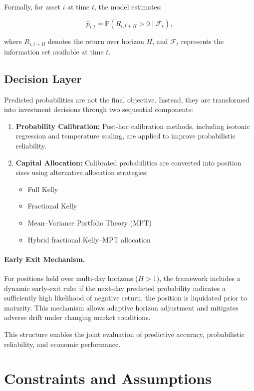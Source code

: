\documentclass{l4proj}
\begin{document}
Formally, for asset $i$ at time $t$, the model estimates:

\[
\hat{p}_{i,t} = \mathbb{P}(R_{i,t+H} > 0 \mid \mathcal{F}_t),
\]

where $R_{i,t+H}$ denotes the return over horizon $H$, and $\mathcal{F}_t$ represents the information set available at time $t$.

\subsection{Decision Layer}

Predicted probabilities are not the final objective. Instead, they are transformed into investment decisions through two sequential components:

\begin{enumerate}
    \item \textbf{Probability Calibration:}  
    Post-hoc calibration methods, including isotonic regression and temperature scaling, are applied to improve probabilistic reliability.

    \item \textbf{Capital Allocation:}  
    Calibrated probabilities are converted into position sizes using alternative allocation strategies:
    \begin{itemize}
        \item Full Kelly
        \item Fractional Kelly
        \item Mean–Variance Portfolio Theory (MPT)
        \item Hybrid fractional Kelly–MPT allocation
    \end{itemize}
\end{enumerate}

\paragraph{Early Exit Mechanism.}
For positions held over multi-day horizons ($H > 1$), the framework includes a dynamic early-exit rule: if the next-day predicted probability indicates a sufficiently high likelihood of negative return, the position is liquidated prior to maturity. This mechanism allows adaptive horizon adjustment and mitigates adverse drift under changing market conditions.

This structure enables the joint evaluation of predictive accuracy, probabilistic reliability, and economic performance.

\section{Constraints and Assumptions}
\end{document}
